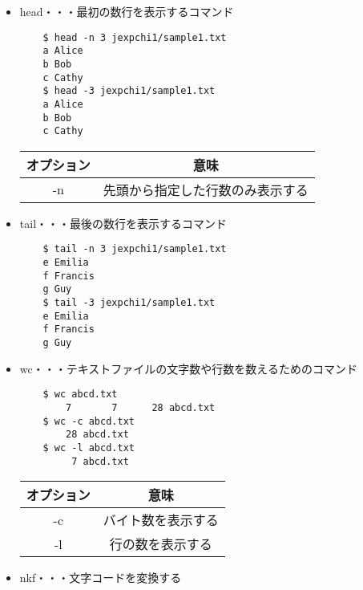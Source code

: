 \documentclass[a4paper,12pt]{jarticle}
\begin{document}
\begin{itemize}
          \clearpage
    \item head・・・最初の数行を表示するコマンド
          \begin{lstlisting}
    $ head -n 3 jexpchi1/sample1.txt
    a Alice
    b Bob
    c Cathy
    $ head -3 jexpchi1/sample1.txt
    a Alice
    b Bob
    c Cathy
        \end{lstlisting}
          \begin{table}[h]
              \begin{center}
                  \begin{tabular}{|c|c|} \hline
                      オプション & 意味                             \\ \hline
                      -n         & 先頭から指定した行数のみ表示する \\ \hline
                  \end{tabular}
              \end{center}
          \end{table}
    \item tail・・・最後の数行を表示するコマンド
          \begin{lstlisting}
    $ tail -n 3 jexpchi1/sample1.txt
    e Emilia
    f Francis
    g Guy
    $ tail -3 jexpchi1/sample1.txt
    e Emilia
    f Francis
    g Guy
            \end{lstlisting}
    \item wc・・・テキストファイルの文字数や行数を数えるためのコマンド
          \begin{lstlisting}
    $ wc abcd.txt
        7       7      28 abcd.txt
    $ wc -c abcd.txt
        28 abcd.txt
    $ wc -l abcd.txt
         7 abcd.txt
                \end{lstlisting}
          \begin{table}[h]
              \begin{center}
                  \begin{tabular}{|c|c|} \hline
                      オプション & 意味               \\ \hline
                      -c         & バイト数を表示する \\ \hline
                      -l         & 行の数を表示する   \\ \hline
                  \end{tabular}
              \end{center}
          \end{table}
          \clearpage
    \item nkf・・・文字コードを変換する

\end{itemize}
\end{document}
